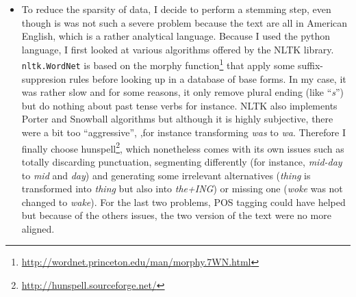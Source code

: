 \begin{itemize}
\item To reduce the sparsity of data, I decide to perform a stemming step, even though is was not such a severe problem because the text are all in American English, which is a rather analytical language. Because I used the python language, I first looked at various algorithms offered by the NLTK library\autocite{bird2009nltk}. \texttt{nltk.WordNet} is based on the morphy function\footnote{\href{http://wordnet.princeton.edu/man/morphy.7WN.html}{http://wordnet.princeton.edu/man/morphy.7WN.html}} that apply some suffix-suppresion rules before looking up in a database of base forms. In my case, it was rather slow and for some reasons, it only remove plural ending (like \enquote{\emph{s}}) but do nothing about past tense verbs for instance. NLTK also implements Porter\autocite{porter1980algo} and Snowball\autocite{porter2001snowball} algorithms but although it is highly subjective, there were a bit too \enquote{aggressive}, ,for instance transforming \emph{was} to \emph{wa}.  Therefore I finally choose hunspell\footnote{\href{http://hunspell.sourceforge.net/}{http://hunspell.sourceforge.net/}}, which nonetheless comes with its own issues such as totally discarding punctuation, segmenting differently (for instance, \emph{mid-day} to \emph{mid} and \emph{day}) and generating some irrelevant alternatives (\emph{thing} is transformed into \emph{thing} but also into \emph{the+ING}) or missing one (\emph{woke} was not changed to \emph{wake}). For the last two problems, POS tagging could have helped but because of the others issues, the two version of the text were no more aligned.


\end{itemize}
